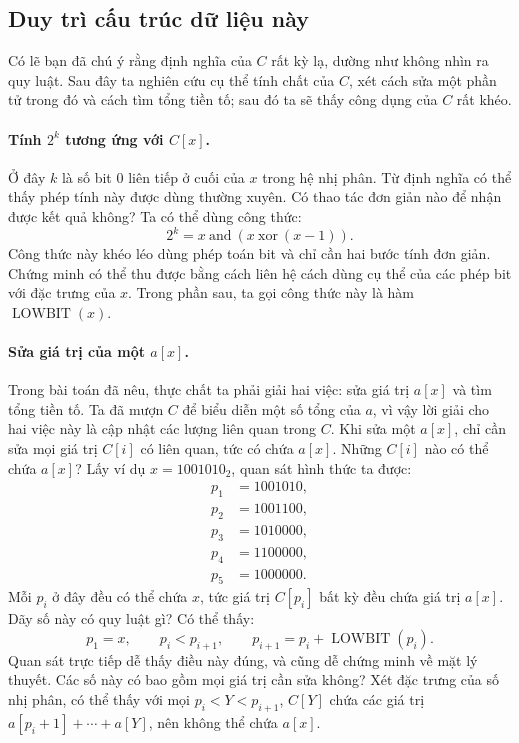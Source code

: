 \documentclass[11pt]{article}
\begin{document}
\subsection{Duy trì cấu trúc dữ liệu này}

Có lẽ bạn đã chú ý rằng định nghĩa của \(C\) rất kỳ lạ, dường như không nhìn
ra quy luật. Sau đây ta nghiên cứu cụ thể tính chất của \(C\), xét cách sửa
một phần tử trong đó và cách tìm tổng tiền tố; sau đó ta sẽ thấy công dụng của
\(C\) rất khéo.

\paragraph{Tính \(2^k\) tương ứng với \(C[x]\).}
Ở đây \(k\) là số bit \(0\) liên tiếp ở cuối của \(x\) trong hệ nhị phân.
Từ định nghĩa có thể thấy phép tính này được dùng thường xuyên. Có thao tác
đơn giản nào để nhận được kết quả không? Ta có thể dùng công thức:
\[
  2^k=x\ \mathrm{and}\ (x\ \mathrm{xor}\ (x-1)).
\]
Công thức này khéo léo dùng phép toán bit và chỉ cần hai bước tính đơn giản.
Chứng minh có thể thu được bằng cách liên hệ cách dùng cụ thể của các phép bit
với đặc trưng của \(x\). Trong phần sau, ta gọi công thức này là hàm
\(\operatorname{LOWBIT}(x)\).

\paragraph{Sửa giá trị của một \(a[x]\).}
Trong bài toán đã nêu, thực chất ta phải giải hai việc: sửa giá trị \(a[x]\)
và tìm tổng tiền tố. Ta đã mượn \(C\) để biểu diễn một số tổng của \(a\), vì
vậy lời giải cho hai việc này là cập nhật các lượng liên quan trong \(C\).
Khi sửa một \(a[x]\), chỉ cần sửa mọi giá trị \(C[i]\) có liên quan, tức có
chứa \(a[x]\). Những \(C[i]\) nào có thể chứa \(a[x]\)? Lấy ví dụ
\(x=1001010_2\), quan sát hình thức ta được:
\[
\begin{aligned}
p_1&=1001010,\\
p_2&=1001100,\\
p_3&=1010000,\\
p_4&=1100000,\\
p_5&=1000000.
\end{aligned}
\]
Mỗi \(p_i\) ở đây đều có thể chứa \(x\), tức giá trị \(C[p_i]\) bất kỳ đều
chứa giá trị \(a[x]\). Dãy số này có quy luật gì? Có thể thấy:
\[
  p_1=x,\qquad p_i<p_{i+1},\qquad
  p_{i+1}=p_i+\operatorname{LOWBIT}(p_i).
\]
Quan sát trực tiếp dễ thấy điều này đúng, và cũng dễ chứng minh về mặt lý
thuyết. Các số này có bao gồm mọi giá trị cần sửa không? Xét đặc trưng của số
nhị phân, có thể thấy với mọi \(p_i<Y<p_{i+1}\), \(C[Y]\) chứa các giá trị
\(a[p_i+1]+\cdots+a[Y]\), nên không thể chứa \(a[x]\).
\end{document}
